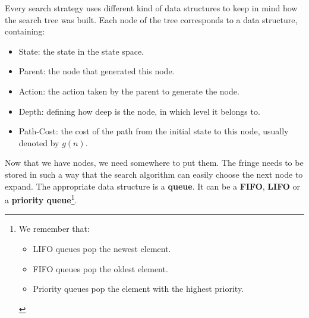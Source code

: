 Every search strategy uses different kind of data structures to keep in mind how the search tree was built. Each node of the tree corresponds to a data structure, containing:
\begin{itemize}
    \renewcommand{\labelitemi}{-}
    \item State: the state in the state space.
    \item Parent: the node that generated this node.
    \item Action: the action taken by the parent to generate the node.
    \item Depth: defining how deep is the node, in which level it belongs to.
    \item Path-Cost: the cost of the path from the initial state to this node, usually denoted by $g(n)$.
\end{itemize}
Now that we have nodes, we need somewhere to put them. The fringe needs to be stored in such a way that the search algorithm can easily choose the next node to expand. The 
appropriate data structure is a \textbf{queue}. It can be a \textbf{FIFO}, \textbf{LIFO} or a \textbf{priority queue}\footnote{We remember that: 
    \begin{itemize}
        \setlength{\itemsep}{0pt}
        \renewcommand{\labelitemi}{-}
        \item LIFO queues pop the newest element.
        \item FIFO queues pop the oldest element.
        \item Priority queues pop the element with the highest priority.
    \end{itemize}
}.